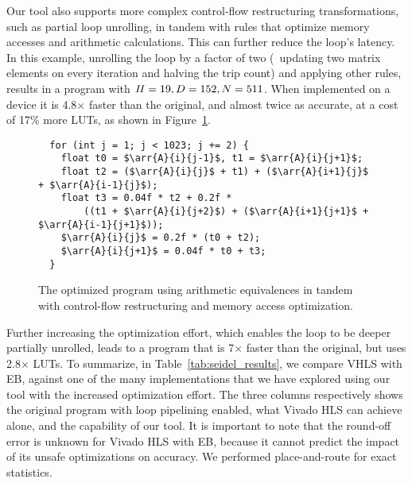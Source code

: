 Our tool also supports more complex control-flow restructuring transformations,
such as partial loop unrolling, in tandem with rules that optimize memory
accesses and arithmetic calculations.  This can further reduce the loop's
latency.  In this example, unrolling the loop by a factor of two (\ie~updating
two matrix elements on every iteration and halving the trip count) and
applying other rules, results in a program with $\mathit{II} = 19, D = 152, N = 511$.
When implemented on a device it is 4.8$\times$ faster than the original,
and almost twice as accurate, at a cost of 17\% more LUTs, as shown in
Figure~\ref{fig:seidel_prog_3}.

\begin{figure}[ht]
\begin{lstlisting}
  for (int j = 1; j < 1023; j += 2) {
    float t0 = $\arr{A}{i}{j-1}$, t1 = $\arr{A}{i}{j+1}$;
    float t2 = ($\arr{A}{i}{j}$ + t1) + ($\arr{A}{i+1}{j}$ + $\arr{A}{i-1}{j}$);
    float t3 = 0.04f * t2 + 0.2f *
        ((t1 + $\arr{A}{i}{j+2}$) + ($\arr{A}{i+1}{j+1}$ + $\arr{A}{i-1}{j+1}$));
    $\arr{A}{i}{j}$ = 0.2f * (t0 + t2);
    $\arr{A}{i}{j+1}$ = 0.04f * t0 + t3;
  }
\end{lstlisting}
    \caption{The optimized program using arithmetic equivalences in tandem with
    control-flow restructuring and memory access optimization.}
    \label{fig:seidel_prog_3}
\end{figure}

Further increasing the optimization effort, which enables the loop to
be deeper partially unrolled, leads to a program that is 7$\times$
faster than the original, but uses 2.8$\times$ LUTs.  To summarize, in
Table~\ref{tab:seidel_results}, we compare VHLS with EB, against one of the
many implementations that we have explored using our tool with the increased
optimization effort.  The three columns respectively shows the original
program with loop pipelining enabled, what Vivado HLS can achieve alone, and
the capability of our tool.  It is important to note that the round-off error
is unknown for Vivado HLS with EB, because it cannot predict the impact of
its unsafe optimizations on accuracy.  We performed place-and-route for exact
statistics.

